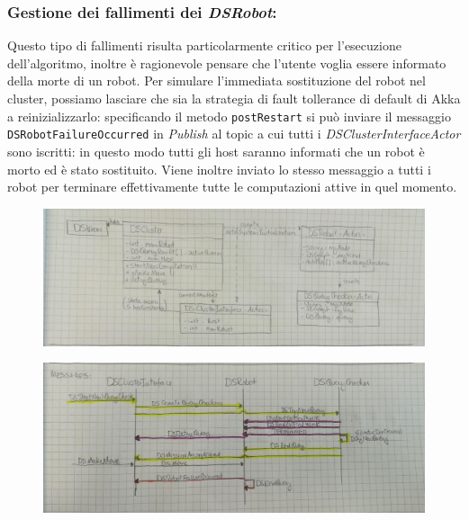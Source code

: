 \subsubsection*{Gestione dei fallimenti dei \emph{DSRobot}:}
Questo tipo di fallimenti risulta particolarmente critico per
l'esecuzione dell'algoritmo, inoltre è ragionevole pensare che
l'utente voglia essere informato della morte di un robot.
Per simulare l'immediata sostituzione del robot nel cluster,
possiamo lasciare che sia la strategia di fault tollerance di default
di Akka a reinizializzarlo: specificando il metodo \texttt{postRestart}
si può inviare il messaggio \texttt{DSRobotFailureOccurred}
in \emph{Publish} al topic a cui tutti i
\emph{DSClusterInterfaceActor} sono iscritti: in questo modo tutti gli
host saranno informati che un robot è morto ed è stato sostituito.
Viene inoltre inviato lo stesso messaggio a tutti i
robot per terminare effettivamente tutte le computazioni attive
in quel momento.
%
\begin{figure}[ht!]
\centering
\includegraphics[width=\textwidth]{UML-classes.jpg}
\caption{\label{fig:UML-classes}
}
\end{figure}
\begin{figure}[ht!]
\centering
\includegraphics[width=\textwidth]{UML-messages.jpg}
\caption{\label{fig:UML-messages}
}
\end{figure}
%
